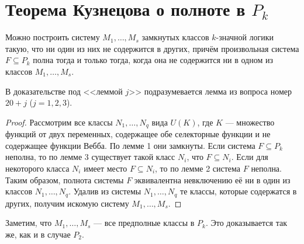 \section{Теорема Кузнецова о полноте в $P_k$}

\begin{theorem}[Кузнецов]
    Можно построить систему $M_1, \ldots, M_s$ замкнутых классов $k$-значной логики такую, что ни один из них не содержится в других, причём произвольная система $F \subseteq P_k$ полна тогда и только тогда, когда она не содержится ни в одном из классов $M_1, \ldots, M_s$.
\end{theorem}

В доказательстве под <<леммой $j$>> подразумевается лемма из вопроса номер $20 + j$ ($j = 1, 2, 3$).

\begin{proof}
    Рассмотрим все классы $N_1, \ldots, N_q$ вида $U(K)$, где $K$ --- множество функций от двух переменных, содержащее обе селекторные функции и не содержащее функции Вебба. По лемме 1 они замкнуты. Если система $F \subseteq P_k$ неполна, то по лемме 3 существует такой класс $N_i$, что $F \subseteq N_i$. Если для некоторого класса $N_i$ имеет место $F \subseteq N_i$, то по лемме 2 система $F$ неполна. Таким образом, полнота системы $F$ эквивалентна невключению её ни в один из классов $N_1, \ldots, N_q$. Удалив из системы $N_1, \ldots, N_q$ те классы, которые содержатся в других, получим искомую систему $M_1, \ldots, M_s$.
\end{proof}

\begin{remark}
    Заметим, что $M_1, \ldots, M_s$ --- все предполные классы в $P_k$. Это доказывается так же, как и в случае $P_2$.
\end{remark}

